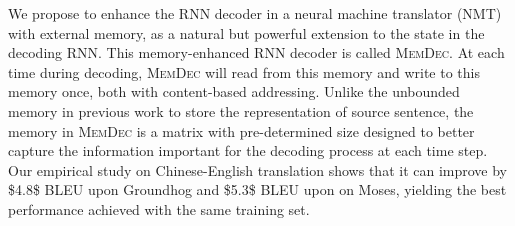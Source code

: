 We propose to enhance the RNN decoder in a neural machine translator (NMT) with external memory, as a natural but powerful extension to the state in the decoding RNN. This memory-enhanced RNN decoder is called \textsc{MemDec}. At each time during decoding, \textsc{MemDec} will read from this memory and write to this memory once, both with content-based addressing. Unlike the unbounded memory in previous work\cite{RNNsearch} to store the representation of source sentence, the memory in \textsc{MemDec} is a matrix with pre-determined size designed to better capture the information important for the decoding process at each time step. Our empirical study on Chinese-English translation shows that it can improve by \$4.8\$ BLEU upon Groundhog and \$5.3\$ BLEU upon on Moses, yielding the best performance achieved with the same training set.
